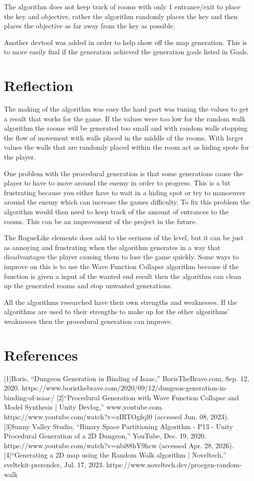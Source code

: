 \documentclass{article}
\begin{document}
The algorithm does not keep track of rooms with only 1 entrance/exit to place the key and objective, rather the algorithm randomly
places the key and then places the objective as far away from the key as possible. 

Another devtool was added in order to help show off the map generation. This is to more easily find if the generation achieved
the generation goals listed in Goals.


\section*{Reflection}
The making of the algorithm was easy the hard part was tuning the values to get a result that works for the game. If the values
were too low for the random walk algorithm the rooms will be generated too small and with random walls stopping the flow of movement
with walls placed in the middle of the rooms. With larger values the walls that are randomly placed within the room act as hiding
spots for the player.

One problem with the procedural generation is that some generations cause the player to have to move around the enemy in order to
progress. This is a bit frustrating because you either have to wait in a hiding spot or try to manoeuver around the enemy which can
increase the games difficulty. To fix this problem the algorithm would then need to keep track of the amount of entrances to the rooms.
This can be an improvement of the project in the future.

The RogueLike elements does add to the eeriness of the level, but it can be just as annoying and frustrating when the algorithm 
generates in a way that disadvantages the player causing them to lose the game quickly. Some ways to improve on this is to use 
the Wave Function Collapse algorithm because if the function is given a input of the wanted end result then the algorithm can
clean up the generated rooms and stop unwanted generations.

All the algorithms researched have their own strengths and weaknesses. If the algorithms are used to their strengths to make
up for the other algorithms' weaknesses then the procedural generation can improve.

\section*{References}
[1]Boris, “Dungeon Generation in Binding of Isaac,” BorisTheBrave.com, Sep. 12, 2020. https://www.boristhebrave.com/2020/09/12/dungeon-generation-in-binding-of-isaac/
[2]“Procedural Generation with Wave Function Collapse and Model Synthesis | Unity Devlog,” www.youtube.com. https://www.youtube.com/watch?v=zIRTOgfsjl0 (accessed Jun. 08, 2023).
‌[3]Sunny Valley Studio, “Binary Space Partitioning Algorithm - P13 - Unity Procedural Generation of a 2D Dungeon,” YouTube, Dec. 19, 2020. https://www.youtube.com/watch?v=nbi88hY9hcw (accessed Apr. 28, 2026).
[4]“Generating a 2D map using the Random Walk algorithm | Noveltech,” sveltekit-prerender, Jul. 17, 2023. https://www.noveltech.dev/procgen-random-walk
‌
\glsaddall
\printglossary
\end{document}
